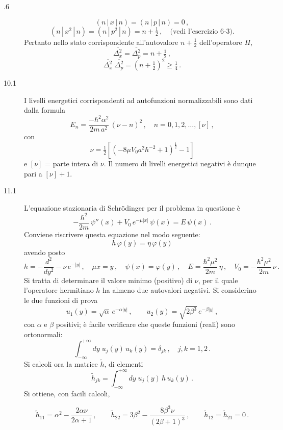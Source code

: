 \documentclass[11pt, a4paper]{book}
\numberwithin{equation}{section}
\begin{document}
\begin{description}
\item[.6]
\[
  (n\,|\,x\,|\,n) = (n\,|\,p\,|\,n) = 0\,,
\]
\[
  (n\,|\,x^2\,|\,n) = (n\,|\,p^2\,|\,n) = n+\tfrac{1}{2}\,,\quad\text{(vedi l'esercizio 6-3)}.
\]
Pertanto nello stato corrispondente all'autovalore $n+\frac{1}{2}$ dell'operatore $H$,
\[
  \overline{\Delta^2_x} = \overline{\Delta^2_p} = n+\tfrac{1}{2}\,,
\]
\[
  \overline{\Delta^2_x}\;\overline{\Delta^2_p} = \left(n+\tfrac{1}{2}\right)^2 \geq \tfrac{1}{4}\,.
\]

\item[10.1] I livelli energetici corrispondenti ad autofunzioni normalizzabili sono dati dalla formula
\[
  E_n = \frac{-\hbar^2\alpha^2}{2m\,a^2}\,(\nu-n)^2\,,\quad n=0,1,2,\ldots,[\nu]\,,
\]
con
\[
  \nu = \tfrac{1}{2}\!\left[(-8\mu V_0 a^2\hbar^{-2}+1)^{\frac{1}{2}}-1\right]
\]
e $[\nu]$ = parte intera di $\nu$. Il numero di livelli energetici negativi è dunque pari a $[\nu]+1$.

\item[11.1] L'equazione stazionaria di Schr\"odinger per il problema in questione è
\[
  -\frac{\hbar^2}{2m}\,\psi''(x) + V_0\,e^{-\mu|x|}\,\psi(x) = E\,\psi(x)\,.
\]
Conviene riscrivere questa equazione nel modo seguente:
\[
  h\,\varphi(y) = \eta\,\varphi(y)
\]
avendo posto
\[
  h = -\frac{d^2}{dy^2} - \nu\,e^{-|y|}\,,\quad
  \mu x = y\,,\quad
  \psi(x) = \varphi(y)\,,\quad
  E = \frac{\hbar^2\mu^2}{2m}\,\eta\,,\quad
  V_0 = -\frac{\hbar^2\mu^2}{2m}\,\nu\,.
\]
Si tratta di determinare il valore minimo (positivo) di $\nu$, per il quale l'operatore hermitiano $h$ ha almeno due autovalori negativi. Si considerino le due funzioni di prova
\[
  u_1(y) = \sqrt{\alpha}\,e^{-\alpha|y|}\,,\qquad
  u_2(y) = \sqrt{2\beta^3}\,e^{-\beta|y|}\,,
\]
con $\alpha$ e $\beta$ positivi; è facile verificare che queste funzioni (reali) sono ortonormali:
\[
  \int_{-\infty}^{+\infty} dy\;u_j(y)\,u_k(y) = \delta_{jk}\,,\quad j,k=1,2\,.
\]
Si calcoli ora la matrice $\tilde{h}$, di elementi
\[
  \tilde{h}_{jk} = \int_{-\infty}^{+\infty} dy\;u_j(y)\,h\,u_k(y)\,.
\]
Si ottiene, con facili calcoli,

\[
\tilde{h}_{11} = \alpha^2 - \frac{2\alpha\nu}{2\alpha+1}\,,
\qquad
\tilde{h}_{22} = 3\beta^2 - \frac{8\beta^3\nu}{(2\beta+1)^3}\,,
\qquad
\tilde{h}_{12} = \tilde{h}_{21} = 0\,.
\]


\end{description}
\end{document}

